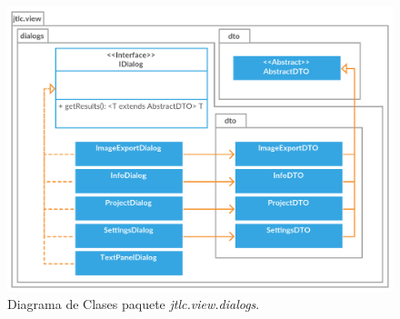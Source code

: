 \begin{figure}[H]
	\centering
	\includegraphics[width=425pt]{imagenes-jtlc/dialogs}
	\centering
	\vspace{-0.5cm}
	\caption{Diagrama de Clases paquete \textit{jtlc.view.dialogs}.}
	\label{fig:dialogsDiagrama}
\end{figure}

